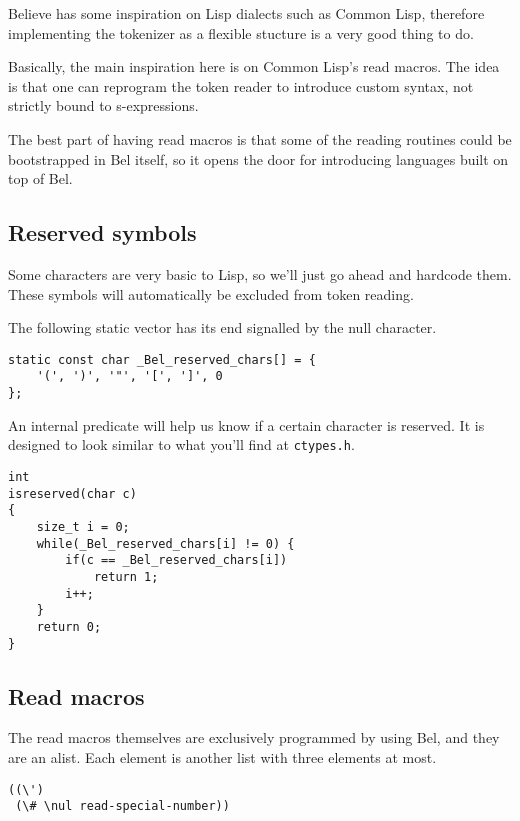 \documentclass[openright,a4paper,twoside,12pt]{memoir}
\begin{document}
Believe has  some inspiration  on Lisp dialects  such as  Common Lisp,
therefore implementing the tokenizer as  a flexible stucture is a very
good thing to do.

Basically,  the  main  inspiration  here  is  on  Common  Lisp's  read
macros.  The idea  is  that  one can  reprogram  the  token reader  to
introduce custom syntax, not strictly bound to s-expressions.

The  best part  of having  read  macros is  that some  of the  reading
routines could be bootstrapped in Bel itself, so it opens the door for
introducing languages built on top of Bel.

\subsection{Reserved symbols}
\label{sec:org4b0dc60}

Some characters  are very basic  to Lisp, so  we'll just go  ahead and
hardcode them. These symbols will automatically be excluded from token
reading.

The following static vector has its end signalled by the null character.

\begin{verbatim}
static const char _Bel_reserved_chars[] = {
    '(', ')', '"', '[', ']', 0
};
\end{verbatim}

An internal  predicate will  help us  know if  a certain  character is
reserved.  It is  designed  to look  similar to  what  you'll find  at
\texttt{ctypes.h}.

\begin{verbatim}
int
isreserved(char c)
{
    size_t i = 0;
    while(_Bel_reserved_chars[i] != 0) {
        if(c == _Bel_reserved_chars[i])
            return 1;
        i++;
    }
    return 0;
}
\end{verbatim}

\subsection{Read macros}
\label{sec:org5fc7e6c}

The read  macros themselves are  exclusively programmed by  using Bel,
and  they are  an  alist.  Each element  is  another  list with  three
elements at most.

\begin{verbatim}
((\')
 (\# \nul read-special-number))
\end{verbatim}
\end{document}

